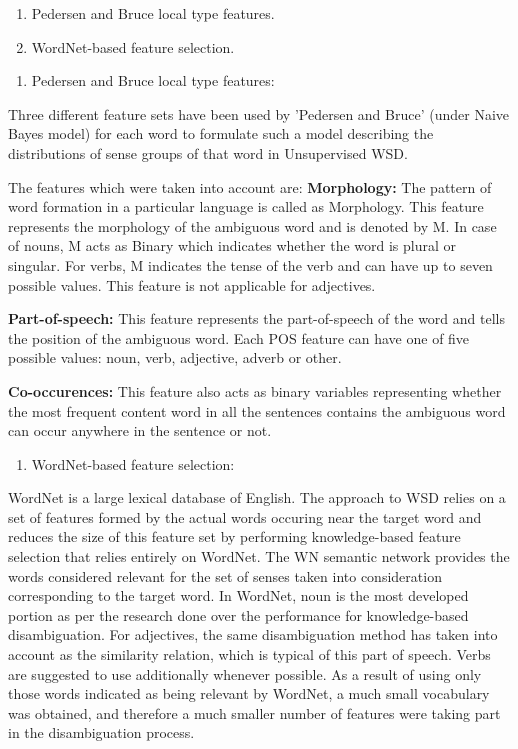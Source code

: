 \begin{enumerate}
	\item Pedersen and Bruce local type features.
	\item WordNet-based feature selection.
\end{enumerate}

\begin{enumerate}
	\item Pedersen and Bruce local type features:
\end{enumerate}
Three different feature sets have been used by 'Pedersen and Bruce' (under Naive Bayes model) for each word to formulate such a model describing the distributions of sense groups of that word in Unsupervised WSD.

The features which were taken into account are:
\textbf{Morphology:} The pattern of word formation in a particular language is called as Morphology.
This feature represents the morphology \cite{5494927} of the ambiguous word and is denoted by M. 
In case of nouns, M acts as Binary which indicates whether the word is plural or singular.
For verbs, M indicates the tense of the verb and can have up to seven possible values.
This feature is not applicable for adjectives.

\textbf{Part-of-speech:} This feature represents the part-of-speech \cite{6982457} of the word and tells the position of the ambiguous word.
Each POS feature can have one of five possible values: noun, verb, adjective, adverb or other.

\textbf{Co-occurences:} This feature also acts as binary variables representing whether the most frequent content word in all the sentences contains the ambiguous word can occur anywhere in the sentence or not.

\begin{enumerate}
	\item WordNet-based feature selection:
\end{enumerate}
WordNet is a large lexical database of English. The approach to WSD relies on a set of features formed by the actual words occuring near the target word and 
reduces the size of this feature set by performing knowledge-based feature selection that relies entirely on WordNet.
The WN semantic network provides the words considered relevant for the set of senses taken into consideration corresponding to the target word.
In WordNet, noun is the most developed portion as per the research done over the performance for knowledge-based disambiguation.
For adjectives, the same disambiguation method has taken into account as the similarity relation, which  is typical of this part of speech.
Verbs are suggested to use additionally whenever possible.
As a result of using only those words indicated as being relevant by WordNet, a much small vocabulary was obtained, 
and therefore a much smaller number of features were taking part in the disambiguation process.

